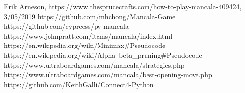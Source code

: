 \documentclass[conference]{IEEEtran}
\begin{document}

\begin{thebibliography}{00}
 Erik Arneson, https://www.thesprucecrafts.com/how-to-play-mancala-409424, 3/05/2019
 https://github.com/mhchong/Mancala-Game
 https://github.com/cypreess/py-mancala
 https://www.johnpratt.com/items/mancala/index.html
 https://en.wikipedia.org/wiki/Minimax#Pseudocode
 https://en.wikipedia.org/wiki/Alpha–beta\_pruning#Pseudocode
 https://www.ultraboardgames.com/mancala/strategies.php
 https://www.ultraboardgames.com/mancala/best-opening-move.php
 https://github.com/KeithGalli/Connect4-Python
\end{thebibliography}
\end{document}
